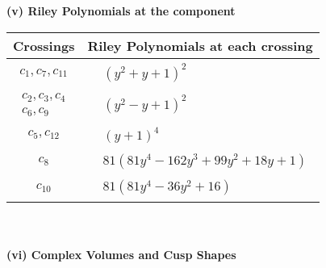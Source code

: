 \documentclass[1p]{elsarticle_modified}
\theoremstyle{definition}
\begin{document}
\newpage\renewcommand{\arraystretch}{1}
\flushleft \textbf{(v) Riley Polynomials at the component}\newline \\
\begin{tabular}{m{50pt}|m{274pt}}
Crossings & \hspace{64pt}Riley Polynomials at each crossing \\
\hline $$\begin{aligned}c_{1},c_{7},c_{11}\end{aligned}$$&$\begin{aligned}
&(y^2+y+1)^2
\end{aligned}$\\
\hline $$\begin{aligned}c_{2},c_{3},c_{4}\\c_{6},c_{9}\end{aligned}$$&$\begin{aligned}
&(y^2- y+1)^2
\end{aligned}$\\
\hline $$\begin{aligned}c_{5},c_{12}\end{aligned}$$&$\begin{aligned}
&(y+1)^4
\end{aligned}$\\
\hline $$\begin{aligned}c_{8}\end{aligned}$$&$\begin{aligned}
&81(81 y^4-162 y^3+99 y^2+18 y+1)
\end{aligned}$\\
\hline $$\begin{aligned}c_{10}\end{aligned}$$&$\begin{aligned}
&81(81 y^4-36 y^2+16)
\end{aligned}$\\
\hline
\end{tabular}\\~\\
\newpage\flushleft \textbf{(vi) Complex Volumes and Cusp Shapes}
\end{document}
